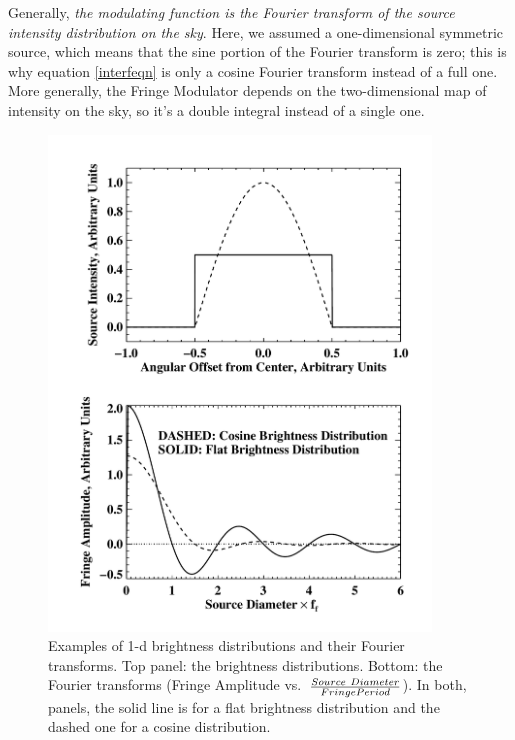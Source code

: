 \documentclass[11pt,preprint]{aastex}
\begin{document}
Generally, {\it the modulating function is the Fourier transform of the
  source intensity distribution on the sky}.  Here, we assumed a
one-dimensional symmetric source, which means that the sine portion of
the Fourier transform is zero; this is why equation \ref{interfeqn} is
only a cosine Fourier transform instead of a full one.  More generally,
the Fringe Modulator depends on the two-dimensional map of intensity on
the sky, so it's a double integral instead of a single one.  
  
\begin{figure}[h!]
\begin{center}
\includegraphics[width=4.0in] {plots/cosfringe.pdf}
\end{center}
                                                                                
\caption{Examples of 1-d brightness distributions and their Fourier
  transforms. Top panel: the brightness distributions. Bottom: the Fourier
  transforms (Fringe Amplitude vs.\ ${Source\ Diameter \over Fringe
    Period}$). In both, panels, the solid line is for a flat brightness
  distribution and the dashed one for a cosine distribution.
\label{cosfringe} } \end{figure}
\end{document}
